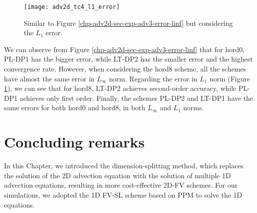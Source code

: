\begin{figure}[!htb]
\centering
\texttt{[image: adv2d\_tc4\_l1\_error]}
\caption{Similar to Figure \ref{chp-adv2d-sec-exp-adv3-error-linf} but considering the $L_1$ error.
\label{chp-adv2d-sec-exp-adv3-error-l1}}
\end{figure}

We can observe from Figure \ref{chp-adv2d-sec-exp-adv3-error-linf} that for hord0, PL-DP1 has the bigger error,
while LT-DP2 has the smaller error and the highest convergence rate.
However, when considering the hord8 scheme, all the schemes have almost the same error in $L_{\infty}$ norm.
Regarding the error in $L_{1}$ norm (Figure \ref{chp-adv2d-sec-exp-adv3-error-l1}), we can see that for hord8,
LT-DP2 achieves second-order accuracy, while PL-DP1 achieves only first order.
Finally, the schemes PL-DP2 and LT-DP1 have the same errors for both hord0 and hord8, in both $L_{\infty}$ and $L_{1}$ norms.
%


\section{Concluding remarks}
\label{chp-2d-fv-conc}
In this Chapter, we introduced the dimension-splitting method, 
which replaces the solution of the 2D advection equation with the
solution of multiple 1D advection equations, resulting in more cost-effective 2D-FV schemes. 
For our simulations, we adopted the 1D FV-SL scheme based on PPM to solve the 1D equations.

